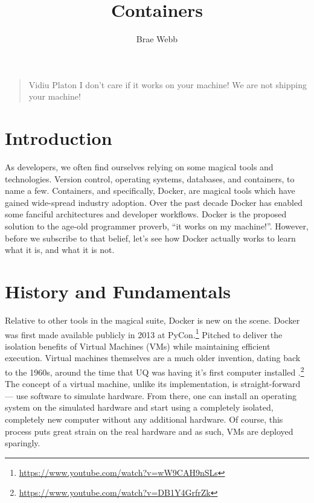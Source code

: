 \title{Containers}
\author{Brae Webb}
\date{}

\maketitle


\begin{quote}{Vidiu Platon}
I don't care if it works on your machine! We are not shipping your machine!
\end{quote}

\section{Introduction}
As developers, we often find ourselves relying on some magical tools and technologies.
Version control, operating systems, databases, and containers, to name a few.
Containers, and specifically, Docker, are magical tools which have gained wide-spread industry adoption.
Over the past decade Docker has enabled some fanciful architectures and developer workflows.
Docker is the proposed solution to the age-old programmer proverb, ``it works on my machine!''.
However, before we subscribe to that belief, let's see how Docker actually works to learn what it is, and what it is not.

\section{History and Fundamentals}
Relative to other tools in the magical suite, Docker is new on the scene.
Docker was first made available publicly in 2013 at PyCon.\footnote{\url{https://www.youtube.com/watch?v=wW9CAH9nSLs}}
Pitched to deliver the isolation benefits of Virtual Machines (VMs) while maintaining efficient execution.
Virtual machines themselves are a much older invention, dating back to the 1960s, around the time that UQ was having it's first computer installed%
.\footnote{\url{https://www.youtube.com/watch?v=DB1Y4GrfrZk}}
The concept of a virtual machine, unlike its implementation, is straight-forward --- use software to simulate hardware.
From there, one can install an operating system on the simulated hardware and start using a completely isolated, completely new computer without any additional hardware.
Of course, this process puts great strain on the real hardware and as such, VMs are deployed sparingly.

